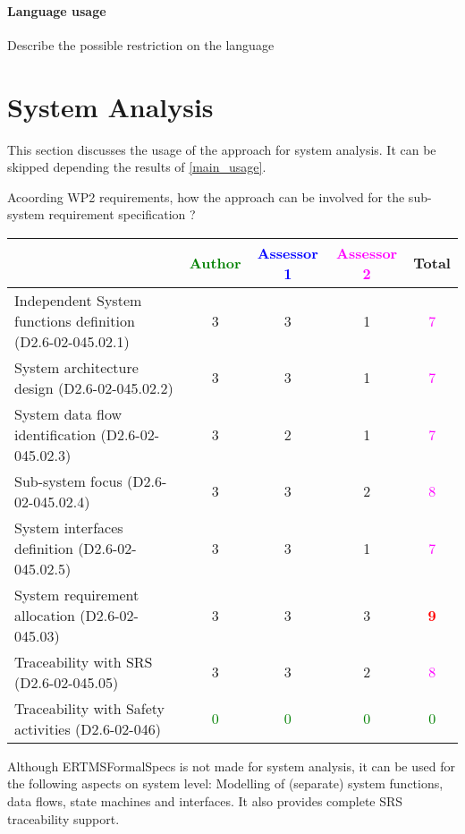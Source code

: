 \paragraph{Language usage} Describe the possible restriction on the language

\section{System Analysis}
This section discusses the usage of the approach for system analysis.
It can be skipped depending the results of \ref{main_usage}.

Acoording WP2 requirements, how the approach can be involved for the sub-system requirement specification ?

\begin{tabular}{|l | c | c | c | c|}
\hline
& \textcolor{green}{Author} & \textcolor{blue}{Assessor 1} & \textcolor{magenta}{Assessor 2} & Total \\
\hline
Independent System functions definition (D2.6-02-045.02.1)  & 3     & 3     & 1     & \textcolor{magenta}{7}  \\
\hline 
System architecture design (D2.6-02-045.02.2) & 3     & 3     & 1     & \textcolor{magenta}{7} \\
\hline
System data flow identification (D2.6-02-045.02.3)  & 3     & 2     & 1     & \textcolor{magenta}{7} \\
\hline
Sub-system focus (D2.6-02-045.02.4)  & 3     & 3     & 2     & \textcolor{magenta}{8} \\
\hline
System interfaces definition (D2.6-02-045.02.5)  & 3     & 3     & 1     & \textcolor{magenta}{7} \\
\hline
System requirement allocation (D2.6-02-045.03)  & 3     & 3     & 3     & \textcolor{red}{\textbf{9}} \\
\hline
Traceability with SRS (D2.6-02-045.05)  & 3     & 3     & 2     & \textcolor{magenta}{8} \\
\hline
Traceability with Safety activities (D2.6-02-046)  & \textcolor{green}{0} & \textcolor{green}{0} & \textcolor{green}{0} & \textcolor{green}{0} \\
\hline
\end{tabular}

\begin{author_comment}
Although ERTMSFormalSpecs is not made for system analysis, it can be used for the following aspects on system level: Modelling of (separate) system functions, data flows, state machines and interfaces. It also provides complete SRS traceability support.  
\end{author_comment}

